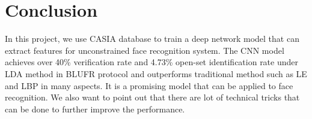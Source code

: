 \documentclass[conference]{IEEEtran}
\begin{document}
\section{Conclusion}

In this project, we use CASIA database to train a deep network model that can extract features for unconstrained face recognition system. The CNN model achieves over 40\% verification rate and 4.73\% open-set identification rate under LDA method in BLUFR protocol and outperforms traditional method such as LE and LBP in many aspects. It is a promising model that can be applied to face recognition. We also want to point out that there are lot of technical tricks that can be done to further improve the performance. 



  
\end{document}
